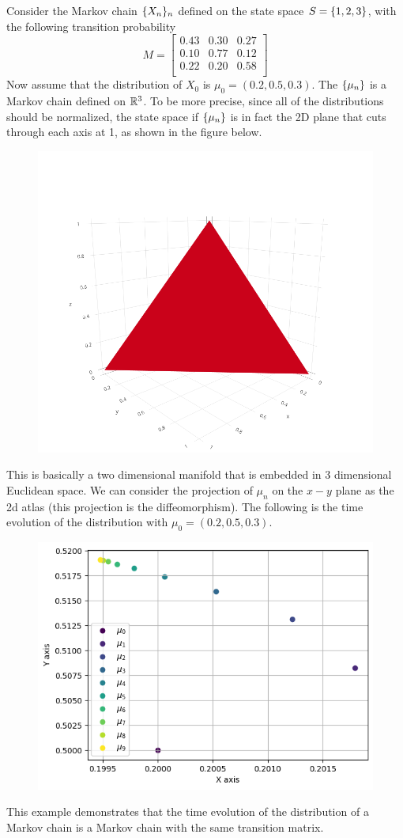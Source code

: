 \begin{example}
	Consider the Markov chain $ \{X_n\}_n $ defined on the state space $ S = \{1,2,3\} $, with the following transition probability
	\[ 
	M = \begin{bmatrix}
		0.43 & 0.30 & 0.27 \\
		0.10 & 0.77 & 0.12 \\
		0.22 & 0.20 & 0.58 \\
	\end{bmatrix}
	 \]
	 Now assume that the distribution of $ X_0 $ is $ \mu_0 = (0.2, 0.5, 0.3) $. The $ \{\mu_n\} $ is a Markov chain defined on $ \mathbb{R}^3 $. To be more precise, since all of the distributions should be normalized, the state space if $ \{\mu_n\} $ is in fact the 2D plane that cuts through each axis at 1, as shown in the figure below. 
	 \begin{figure}[h!]
	 	\centering
	 	\includegraphics[width=0.3\linewidth]{Images/hyperPlanein3D}
	 	\label{fig:hyperplanein3d}
	 \end{figure}
	 This is basically a two dimensional manifold that is embedded in 3 dimensional Euclidean space. We can consider the projection of $ \mu_n $ on the $ x-y $ plane as the 2d atlas (this projection is the diffeomorphism). The following is the time evolution of the distribution with $ \mu_0 = (0.2,0.5,0.3) $.
	 \begin{figure}[h!]
	 	\centering
	 	\includegraphics[width=0.7\linewidth]{Images/timeEvolutionOfDistribution}
	 	\label{fig:timeevolutionofdistribution}
	 \end{figure}
	 This example demonstrates that the time evolution of the distribution of a Markov chain is a Markov chain with the same transition matrix.
\end{example}
\FloatBarrier

